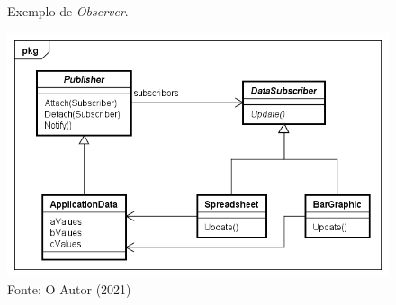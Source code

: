 \begin{figure}[htb]
	\caption{\label{observer_exemplo}Exemplo de \textit{Observer}.}
	\begin{center}
	    \includegraphics[scale=0.5]{5_padroes-contexto-funcional/5.3_comportamentais/5.3.07_observer/observer_exemplo.png}
	\end{center}
  \caption*{Fonte: O Autor (2021)}
\end{figure}

